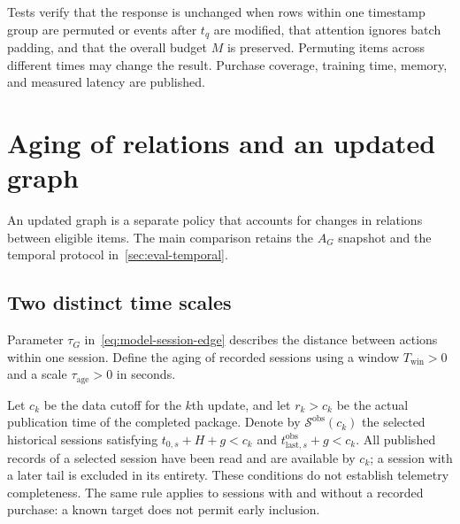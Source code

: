 \documentclass[12pt,a4paper]{article}
\theoremstyle{plainru}
\begin{document}
Tests verify that the response is unchanged when rows within one timestamp
group are permuted or events after $t_q$ are modified,
that attention ignores batch padding, and that the overall budget $M$ is preserved.
Permuting items across different times may change the result.
Purchase coverage, training time, memory, and measured latency are published.

\section{Aging of relations and an updated graph}\label{sec:freshness}

An updated graph is a separate policy that accounts for changes in relations
between eligible items. The main comparison retains the $A_G$ snapshot
and the temporal protocol in~\ref{sec:eval-temporal}.

\subsection{Two distinct time scales}\label{sec:freshness-weights}

Parameter $\tau_G$ in~\eqref{eq:model-session-edge} describes the distance
between actions within one session. Define the aging of recorded sessions
using a window $T_{\mathrm{win}}>0$ and a scale $\tau_{\mathrm{age}}>0$ in seconds.

Let $c_k$ be the data cutoff for the $k$th update,
and let $r_k>c_k$ be the actual publication time of the completed package.
Denote by $\mathcal S^{\mathrm{obs}}(c_k)$ the selected historical
sessions satisfying $t_{0,s}+H+g<c_k$ and
$t_{\mathrm{last},s}^{\mathrm{obs}}+g<c_k$.
All published records of a selected session have been read and are available by $c_k$;
a session with a later tail is excluded in its entirety. These conditions do not establish
telemetry completeness. The same rule applies to sessions with and without a recorded
purchase: a known target does not permit early inclusion.
\end{document}
